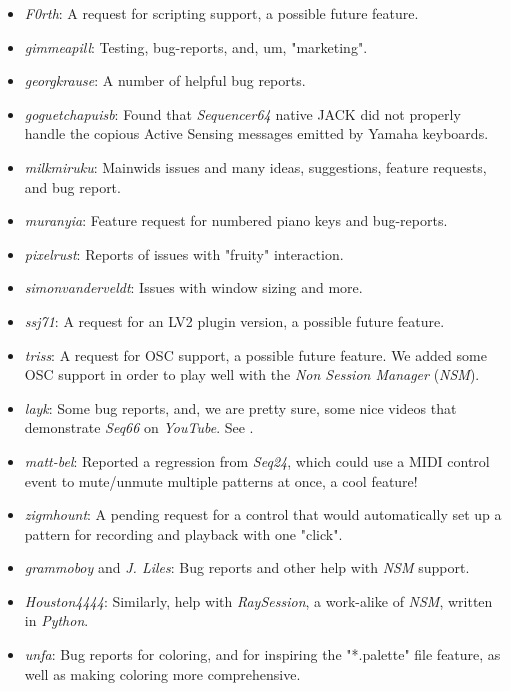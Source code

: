    \begin{itemize}
      \item \textsl{F0rth}:
         A request for scripting support, a possible future feature.
      \item \textsl{gimmeapill}:
         Testing, bug-reports, and, um, "marketing".
      \item \textsl{georgkrause}:
         A number of helpful bug reports.
      \item \textsl{goguetchapuisb}:
         Found that \textsl{Sequencer64} native JACK did not properly handle
         the copious Active Sensing messages emitted by Yamaha keyboards.
      \item \textsl{milkmiruku}:
         Mainwids issues and many ideas, suggestions, feature requests, and bug
         report.
      \item \textsl{muranyia}:
         Feature request for numbered piano keys and bug-reports.
      \item \textsl{pixelrust}:
         Reports of issues with "fruity" interaction.
      \item \textsl{simonvanderveldt}:
         Issues with window sizing and more.
      \item \textsl{ssj71}:
         A request for an LV2 plugin version, a possible future feature.
      \item \textsl{triss}:
         A request for OSC support, a possible future feature.  We added some
         OSC support in order to play well with the \textsl{Non Session
         Manager} (\textsl{NSM}).
      \item \textsl{layk}:
         Some bug reports, and, we are pretty sure, some nice videos that
         demonstrate \textsl{Seq66} on \textsl{YouTube}.  See
         \cite{layk}.
      \item \textsl{matt-bel}:
         Reported a regression from \textsl{Seq24}, which could use
         a MIDI control event to mute/unmute multiple patterns at once,
         a cool feature!
      \item \textsl{zigmhount}:
         A pending request for a control that would automatically set up a
         pattern for recording and playback with one "click".
      \item \textsl{grammoboy} and \textsl{J. Liles}:
         Bug reports and other help with \textsl{NSM} support.
      \item \textsl{Houston4444}:
         Similarly, help with \textsl{RaySession}, a work-alike of
         \textsl{NSM}, written in \textsl{Python}.
      \item \textsl{unfa}:
         Bug reports for coloring, and for inspiring the "*.palette" file
         feature, as well as making coloring more comprehensive.
   \end{itemize}

